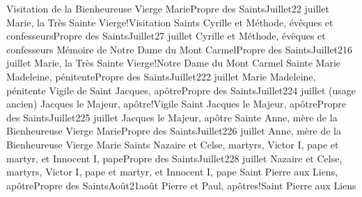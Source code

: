 \documentclass[twoside, french]{book}
\begin{document}
        {Visitation de la Bienheureuse Vierge Marie}{Propre des Saints}{Juillet}{2}{2 juillet}
        {}{}{Marie, la Très Sainte Vierge!Visitation}{}{}
        {Saints Cyrille et Méthode, évêques et confesseurs}{Propre des Saints}{Juillet}{2}{7 juillet}
        {}{}{Cyrille et Méthode, évêques et confesseurs}{}{}
        {Mémoire de Notre Dame du Mont Carmel}{Propre des Saints}{Juillet}{2}{16 juillet}
        {}{}{Marie, la Très Sainte Vierge!Notre Dame du Mont Carmel}{}{}
        {Sainte Marie Madeleine, pénitente}{Propre des Saints}{Juillet}{2}{22 juillet}
        {}{}{Marie Madeleine, pénitente}{}{}
        {Vigile de Saint Jacques, apôtre}{Propre des Saints}{Juillet}{2}{24 juillet (usage ancien)}
        {}{}{Jacques le Majeur, apôtre!Vigile}{}{}
        {Saint Jacques le Majeur, apôtre}{Propre des Saints}{Juillet}{2}{25 juillet}
        {}{}{Jacques le Majeur, apôtre}{}{}
        {Sainte Anne, mère de la Bienheureuse Vierge Marie}{Propre des Saints}{Juillet}{2}{26 juillet}
        {}{}{Anne, mère de la Bienheureuse Vierge Marie}{}{}
        {Saints Nazaire et Celse, martyrs, Victor I\ier, pape et martyr, et Innocent I\ier, pape}{Propre des Saints}{Juillet}{2}{28 juillet}
        {}{}{Nazaire et Celse, martyrs, Victor I\ier, pape et martyr, et Innocent I\ier, pape}{}{}
        {Saint Pierre aux Liens, apôtre}{Propre des Saints}{Août}{2}{1\ier août}
        {}{}{Pierre et Paul, apôtres!Saint Pierre aux Liens}{}{}
\end{document}
